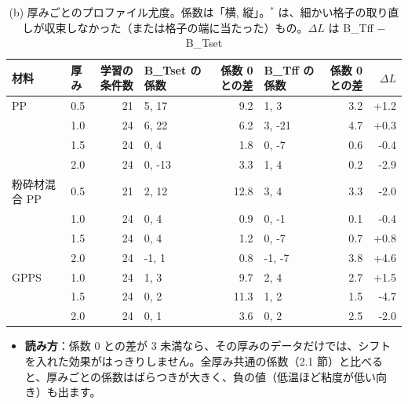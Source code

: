 \documentclass[paper=a4paper,fontsize=10.5pt,line_length=44zw,number_of_lines=38]{jlreq}
\newenvironment{points}{\begin{itemize}[label=$\triangleright$,leftmargin=1.5\zw,itemsep=0.3ex,topsep=0.5ex,parsep=0pt]}{\end{itemize}}
\newcommand{\pt}[1]{\item \textbf{#1}：}
\begin{document}
\begin{table}[H]
\caption{(b) 厚みごとのプロファイル尤度。係数は「横, 縦」。$^{*}$ は、細かい格子の取り直しが収束しなかった（または格子の端に当たった）もの。$\Delta L$ は B\_Tff − B\_Tset}\label{tab:prof}
\scriptsize
\begin{tabularx}{\linewidth}{@{}llrXrXrr@{}}
\toprule
材料 & 厚み & 学習の条件数 & B\_Tset の係数 & 係数 0 との差 & B\_Tff の係数 & 係数 0 との差 & $\Delta L$ \\
\midrule
PP & 0.5 & 21 & 5, 17 & 9.2 & 1, 3 & 3.2 & +1.2 \\
 & 1.0 & 24 & 6, 22 & 6.2 & 3, -21 & 4.7 & +0.3 \\
 & 1.5 & 24 & 0, 4 & 1.8 & 0, -7 & 0.6 & -0.4 \\
 & 2.0 & 24 & 0, -13 & 3.3 & 1, 4 & 0.2 & -2.9 \\
\midrule
粉砕材混合 PP & 0.5 & 21 & 2, 12 & 12.8 & 3, 4 & 3.3 & -2.0 \\
 & 1.0 & 24 & 0, 4 & 0.9 & 0, -1 & 0.1 & -0.4 \\
 & 1.5 & 24 & 0, 4 & 1.2 & 0, -7 & 0.7 & +0.8 \\
 & 2.0 & 24 & -1, 1 & 0.8 & -1, -7 & 3.8 & +4.6 \\
\midrule
GPPS & 1.0 & 24 & 1, 3 & 9.7 & 2, 4 & 2.7 & +1.5 \\
 & 1.5 & 24 & 0, 2 & 11.3 & 1, 2 & 1.5 & -4.7 \\
 & 2.0 & 24 & 0, 1 & 3.6 & 0, 2 & 2.5 & -2.0 \\

\bottomrule
\end{tabularx}
\end{table}
\begin{points}
\pt{読み方}係数 0 との差が 3 未満なら、その厚みのデータだけでは、シフトを入れた効果がはっきりしません。全厚み共通の係数（2.1 節）と比べると、厚みごとの係数はばらつきが大きく、負の値（低温ほど粘度が低い向き）も出ます。
\end{points}
\end{document}
